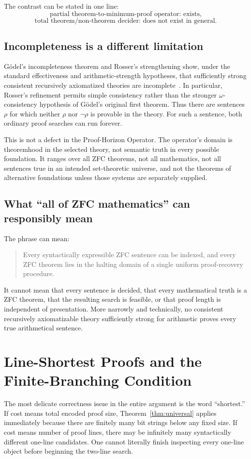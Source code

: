 \documentclass[11pt,oneside]{book}
\theoremstyle{definition}
\theoremstyle{remark}
\begin{document}
The contrast can be stated in one line:
\[
\text{partial theorem-to-minimum-proof operator: exists,}
\]
\[
\text{total theorem/non-theorem decider: does not exist in general.}
\]

\section{Incompleteness is a different limitation}
G\"odel's incompleteness theorem and Rosser's strengthening show, under the standard effectiveness and arithmetic-strength hypotheses, that sufficiently strong consistent recursively axiomatized theories are incomplete~\cite{godel1931,rosser1936}. In particular, Rosser's refinement permits simple consistency rather than the stronger $\omega$-consistency hypothesis of G\"odel's original first theorem. Thus there are sentences $\rho$ for which neither $\rho$ nor $\neg\rho$ is provable in the theory. For such a sentence, both ordinary proof searches can run forever.

This is not a defect in the Proof-Horizon Operator. The operator's domain is theoremhood in the selected theory, not semantic truth in every possible foundation. It ranges over all ZFC theorems, not all mathematics, not all sentences true in an intended set-theoretic universe, and not the theorems of alternative foundations unless those systems are separately supplied.

\section{What ``all of ZFC mathematics'' can responsibly mean}
The phrase can mean:
\begin{quote}
Every syntactically expressible ZFC sentence can be indexed, and every ZFC theorem lies in the halting domain of a single uniform proof-recovery procedure.
\end{quote}
It cannot mean that every sentence is decided, that every mathematical truth is a ZFC theorem, that the resulting search is feasible, or that proof length is independent of presentation. More narrowly and technically, no consistent recursively axiomatizable theory sufficiently strong for arithmetic proves every true arithmetical sentence.

\chapter{Line-Shortest Proofs and the Finite-Branching Condition}\label{ch:lines}
The most delicate correctness issue in the entire argument is the word ``shortest.'' If cost means total encoded proof size, Theorem~\ref{thm:universal} applies immediately because there are finitely many bit strings below any fixed size. If cost means number of proof lines, there may be infinitely many syntactically different one-line candidates. One cannot literally finish inspecting every one-line object before beginning the two-line search.
\end{document}
